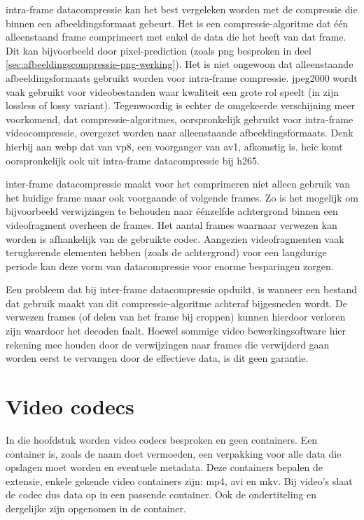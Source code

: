 \Gls{intra-frame} \gls{datacompressie} kan het best vergeleken worden met de compressie die binnen een \gls{afbeeldingsformaat} gebeurt. Het is een \gls{compressie-algoritme} dat één alleenstaand \gls{frame} comprimeert met enkel de data die het heeft van dat \gls{frame}. Dit kan bijvoorbeeld door \gls{pixel-prediction} (zoals \gls{png} besproken in deel \ref{sec:afbeeldingscompressie-png-werking}). Het is niet ongewoon dat alleenstaande \glspl{afbeeldingsformaat} gebruikt worden voor \gls{intra-frame} compressie. \Gls{jpeg2000} wordt vaak gebruikt voor videobestanden waar kwaliteit een grote rol speelt (in zijn \gls{lossless} of \gls{lossy} variant). Tegenwoordig is echter de omgekeerde verschijning meer voorkomend, dat \glspl{compressie-algoritme}, oorspronkelijk gebruikt voor \gls{intra-frame} \gls{videocompressie}, overgezet worden naar alleenstaande \glspl{afbeeldingsformaat}. Denk hierbij aan \gls{webp} dat van \gls{vp8}, een voorganger van \gls{av1}, afkomstig is. \Gls{heic} komt oorspronkelijk ook uit \gls{intra-frame} \gls{datacompressie} bij \gls{h265}.

\Gls{inter-frame} \gls{datacompressie} maakt voor het comprimeren niet alleen gebruik van het huidige \gls{frame} maar ook voorgaande of volgende \glspl{frame}. Zo is het mogelijk om bijvoorbeeld verwijzingen te behouden naar éénzelfde achtergrond binnen een videofragment overheen de \glspl{frame}. Het aantal \glspl{frame} waarnaar verwezen kan worden is afhankelijk van de gebruikte \gls{codec}. Aangezien videofragmenten vaak terugkerende elementen hebben (zoals de achtergrond) voor een langdurige periode kan deze vorm van \gls{datacompressie} voor enorme besparingen zorgen. 

Een probleem dat bij \gls{inter-frame} \gls{datacompressie} opduikt, is wanneer een bestand dat gebruik maakt van dit \gls{compressie-algoritme} achteraf bijgesneden wordt. De verwezen \glspl{frame} (of delen van het frame bij croppen) kunnen hierdoor verloren zijn waardoor het decoden faalt. Hoewel sommige video bewerkingsoftware hier rekening mee houden door de verwijzingen naar \glspl{frame} die verwijderd gaan worden eerst te vervangen door de effectieve data, is dit geen garantie.


\section{Video codecs}
\label{sec:videocompressie-video-codecs}

In die hoofdstuk worden video \glspl{codec} besproken en geen \glspl{container}. Een \gls{container} is, zoals de naam doet vermoeden, een verpakking voor alle data die opslagen moet worden en eventuele metadata. Deze containers bepalen de \gls{extensie},  enkele gekende video \glspl{container} zijn: \gls{mp4}, \gls{avi} en \gls{mkv}. Bij video's slaat de \gls{codec} dus data op in een passende \gls{container}. Ook de ondertiteling en dergelijke zijn opgenomen in de \gls{container}.

